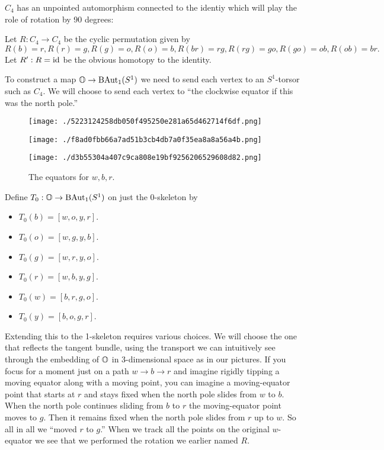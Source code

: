 \(C_4\) has an unpointed automorphism connected to the identiy which
will play the role of rotation by 90 degrees:

\begin{mydef}
Let \( R:C_4\to C_4 \) be the cyclic permutation given by \( R(b)=r, R(r)=g, R(g)=o, R(o)=b, R(br)=rg, R(rg)=go, R(go)=ob, R(ob)=br. \) Let \( R':R=\text{id} \) be the obvious homotopy to the identity.
\end{mydef}

To construct a map \(\mathbb{O}\to\mathrm{BAut}_1(S^1)\) we need to send each vertex to an
\(S^1\)-torsor such as \(C_4\). We will choose to send each vertex to
``the clockwise equator if this was the north pole.''

\begin{figure}
\centering
\begin{minipage}[t]{0.225\linewidth}
\centering
\end{minipage}
\hfill
\begin{minipage}[t]{0.225\linewidth}
\texttt{[image: ./5223124258db050f495250e281a65d462714f6df.png]}
\end{minipage}
\hfill
\begin{minipage}[t]{0.225\linewidth}
\texttt{[image: ./f8ad0fbb66a7ad51b3cb4db7a0f35ea8a8a56a4b.png]}
\end{minipage}
\hfill
\begin{minipage}[t]{0.225\linewidth}
\texttt{[image: ./d3b55304a407c9ca808e19bf9256206529608d82.png]}
\end{minipage}
\caption{The equators for \(w, b, r\).}
\end{figure}

\begin{mydef}
Define \( T_0:\mathbb{O}\to\mathrm{BAut}_1(S^1) \) on just the 0-skeleton by
\begin{itemize}
\item \( T_0(b)=[w, o, y, r] \).
\item \( T_0(o)=[w, g, y, b] \).
\item \( T_0(g)=[w, r, y, o] \).
\item \( T_0(r)=[w, b, y, g] \).
\item \( T_0(w)=[b, r, g, o] \).
\item \( T_0(y)=[b, o, g, r] \).
\end{itemize}
\end{mydef}

Extending this to the 1-skeleton requires various choices. We will
choose the one that reflects the tangent bundle, using the transport we
can intuitively see through the embedding of \(\mathbb{O}\) in 3-dimensional
space as in our pictures. If you focus for a moment just on a path
\(w\to b\to r\) and imagine rigidly tipping a moving equator along with
a moving point, you can imagine a moving-equator point that starts at
\(r\) and stays fixed when the north pole slides from \(w\) to \(b\).
When the north pole continues sliding from \(b\) to \(r\) the
moving-equator point moves to \(g\). Then it remains fixed when the
north pole slides from \(r\) up to \(w\). So all in all we ``moved \(r\)
to \(g\).'' When we track all the points on the original \(w\)-equator
we see that we performed the rotation we earlier named \(R\).

